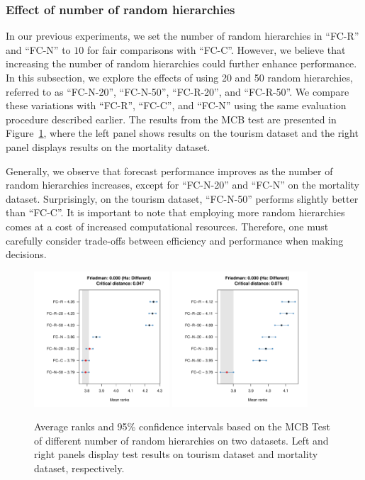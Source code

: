 \documentclass[a4paper,review,12pt,authoryear]{elsarticle}
\begin{document}
\subsubsection*{Effect of number of random hierarchies}

In our previous experiments, we set the number of random hierarchies in ``FC-R'' and ``FC-N'' to $10$ for fair comparisons with ``FC-C''. However, we believe that increasing the number of random hierarchies could further enhance performance. In this subsection, we explore the effects of using 20 and 50 random hierarchies, referred to as ``FC-N-20'', ``FC-N-50'', ``FC-R-20'', and ``FC-R-50''. We compare these variations with ``FC-R'', ``FC-C'', and ``FC-N'' using the same evaluation procedure described earlier. The results from the MCB test are presented in Figure~\ref{fig:number_mcb}, where the left panel shows results on the tourism dataset and the right panel displays results on the mortality dataset.

Generally, we observe that forecast performance improves as the number of random hierarchies increases, except for ``FC-N-20'' and ``FC-N'' on the mortality dataset. Surprisingly, on the tourism dataset, ``FC-N-50'' performs slightly better than ``FC-C''. It is important to note that employing more random hierarchies comes at a cost of increased computational resources. Therefore, one must carefully consider trade-offs between efficiency and performance when making decisions.

\begin{figure}
\centering
\includegraphics[width=0.45\textwidth]{figures/tourism_number_mcb.pdf}
\includegraphics[width=0.45\textwidth]{figures/mortality_number_mcb.pdf}
\caption{\label{fig:number_mcb}Average ranks and 95\% confidence intervals based on the MCB Test of different number of random hierarchies on two datasets. Left and right panels display test results on tourism dataset and mortality dataset, respectively.}
\end{figure}
\end{document}
